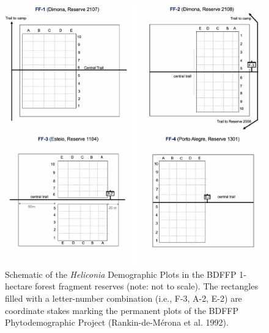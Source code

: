 \documentclass[
  man, donotrepeattitle,floatsintext]{apa6}
\begin{document}
\newpage

\begin{figure}[h]

{\centering \includegraphics{Bruna_etal_MetadataS1_files/figure-latex/plotsone-1} 

}

\caption{Schematic of the \textit{Heliconia} Demographic Plots in the BDFFP 1-hectare forest fragment reserves (note: not to scale). The rectangles filled with a letter-number combination (i.e., F-3, A-2, E-2) are coordinate stakes marking the permanent plots of the BDFFP Phytodemographic Project (Rankin-de-Mérona et al. 1992).}\label{fig:plotsone}
\end{figure}
\end{document}
